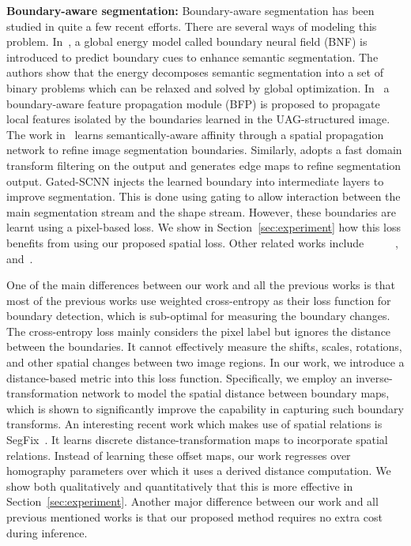 \documentclass[final]{cvpr}
\begin{document}
\textbf{Boundary-aware segmentation:} Boundary-aware segmentation has been studied in quite a few recent efforts. There are several ways of modeling this problem. In~\cite{bertasius2016semantic}, a global energy model called boundary neural field (BNF) is introduced to predict boundary cues to enhance semantic segmentation. The authors show that the energy decomposes semantic segmentation into a set of binary problems which can be relaxed and solved by global optimization. In~\cite{ding2019boundary} a boundary-aware feature propagation module (BFP) is proposed to propagate local features isolated by the boundaries learned in the UAG-structured image. The work in~\cite{liu2017learning} learns semantically-aware affinity through a spatial propagation network to refine image segmentation boundaries. Similarly, \cite{chen2016semantic} adopts a fast domain transform filtering on the output and generates edge maps to refine segmentation output. Gated-SCNN \cite{takikawa2019gated} injects the learned boundary into intermediate layers to improve segmentation. This is done using gating to allow interaction between the main segmentation stream and the shape stream. However, these boundaries are learnt using a pixel-based loss. We show in Section~\ref{sec:experiment} how this loss benefits from using our proposed spatial loss. Other related works include~\cite{pointrend}~\cite{ding2019semantic}~\cite{ding2018context}~\cite{lin2017refinenet}~\cite{cheng2017fusionnet} \cite{peng2017large}, and~\cite{kokkinos2016pushing}. 

One of the main differences between our work and all the previous works is that most of the previous works use weighted cross-entropy as their loss function for boundary detection, which is sub-optimal for measuring the boundary changes. The cross-entropy loss mainly considers the pixel label but ignores the distance between the boundaries. It cannot effectively measure the shifts, scales, rotations, and other spatial changes between two image regions. In our work, we introduce a distance-based metric into this loss function. Specifically, we employ an inverse-transformation network to model the spatial distance between boundary maps, which is shown to significantly improve the capability in capturing such boundary transforms. An interesting recent work which makes use of spatial relations is SegFix~\cite{yuan2020segfix}. It learns discrete distance-transformation maps to incorporate spatial relations. Instead of learning these offset maps, our work regresses over homography parameters over which it uses a derived distance computation. We show both qualitatively and quantitatively that this is more effective in Section~\ref{sec:experiment}. Another major difference between our work and all previous mentioned works is that our proposed method requires no extra cost during inference.
\end{document}
